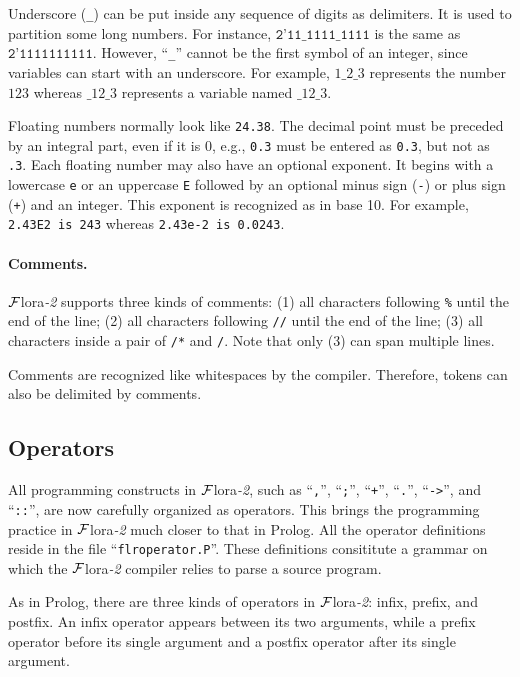 \documentclass[11pt]{article}
\newcommand{\FLORA}{{\mbox{${\cal F}${\sc lora}\rm\emph{-2}}}\xspace}
\begin{document}
Underscore (\texttt{\_}) can be put inside any sequence of digits as
delimiters. It is used to partition some long numbers. For instance,
$\texttt{2'11\_1111\_1111}$ is the same as $\texttt{2'1111111111}$.
However, ``\texttt{\_}'' cannot be the first symbol of an integer, since
variables can start with an underscore. For example, $1\_2\_3$ represents
the number $123$ whereas $\_12\_3$ represents a variable named $\_12\_3$.

Floating numbers normally look like {\tt 24.38}. The decimal point
must be preceded by an integral part, even if it is 0, e.g., {\tt 0.3}
must be entered as {\tt 0.3}, but not as {\tt .3}. Each floating
number may also have an optional exponent. It begins with a lowercase
{\tt e} or an uppercase {\tt E} followed by an optional minus sign
({\tt -}) or plus sign ({\tt +}) and an integer. This exponent is
recognized as in base 10. For example,
\mbox{\tt 2.43E2 is 243} whereas
\mbox{\tt 2.43e-2 is 0.0243}.

\paragraph{Comments.}

%
\FLORA supports three kinds of comments: (1) all characters following
{\tt \%} until the end of the line; (2) all characters following
{\tt //} until the end of the line; (3) all characters inside a pair of
{\tt /*} and {\tt */}. Note that only (3) can span multiple lines.

Comments are recognized like whitespaces by the compiler.  Therefore,
tokens can also be delimited by comments.


\subsection{Operators}


%
All programming constructs in \FLORA, such as ``{\tt ,}'', ``{\tt;}'',
``{\tt +}'', ``{\tt .}'', ``{\tt ->}'', and ``{\tt ::}'', are now
carefully organized as operators.  This brings the programming
practice in \FLORA much closer to that in Prolog. All the operator
definitions reside in the file ``{\tt flroperator.P}''. These
definitions consititute a grammar on which the \FLORA compiler relies
to parse a source program.

As in Prolog, there are three kinds of operators in \FLORA: infix,
prefix, and postfix. An infix operator appears between its two
arguments, while a prefix operator before its single argument and a
postfix operator after its single argument.
\end{document}
